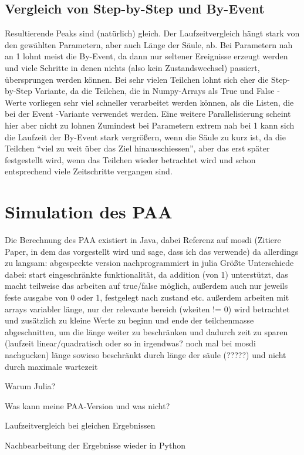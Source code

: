 \subsection{Vergleich von Step-by-Step und By-Event}
Resultierende Peaks sind (natürlich) gleich. Der Laufzeitvergleich hängt stark von den gewählten Parametern, aber auch Länge der Säule, ab.
Bei Parametern nah an 1 lohnt meist die By-Event, da dann nur seltener Ereignisse erzeugt werden und viele Schritte in denen nichts (also kein Zustandswechsel) passiert, übersprungen werden können.
Bei sehr vielen Teilchen lohnt sich eher die Step-by-Step Variante, da die Teilchen, die in Numpy-Arrays als True und False - Werte vorliegen sehr viel schneller verarbeitet werden können, als die Listen, die bei der Event -Variante verwendet werden. Eine weitere Parallelisierung scheint hier aber nicht zu lohnen
Zumindest bei Parametern extrem nah bei 1 kann sich die Laufzeit der By-Event stark vergrößern, wenn die Säule zu kurz ist, da die Teilchen ``viel zu weit über das Ziel hinausschiessen'', aber das erst später festgestellt wird, wenn das Teilchen wieder betrachtet wird und schon entsprechend viele Zeitschritte vergangen sind. 


\section{Simulation des PAA}
Die Berechnung des PAA existiert in Java, dabei Referenz auf mosdi (Zitiere Paper, in dem das vorgestellt wird und sage, dass ich das verwende)
da allerdings zu langsam: abgespeckte version nachprogrammiert in julia
Größte Unterschiede dabei: start eingeschränkte funktionalität, da addition (von 1) unterstützt, das macht teilweise das arbeiten auf true/false möglich, außerdem auch nur jeweils feste ausgabe von 0 oder 1, festgelegt nach zustand etc.
außerdem arbeiten mit arrays variabler länge, nur der relevante bereich (wkeiten != 0) wird betrachtet und zusätzlich zu kleine Werte zu beginn und ende der teilchenmasse abgeschnitten, um die länge weiter zu beschränken und dadurch zeit zu sparen (laufzeit linear/quadratisch oder so in irgendwas? noch mal bei mosdi nachgucken) länge sowieso beschränkt durch länge der säule (?????) und nicht durch maximale wartezeit

Warum Julia? 

Was kann meine PAA-Version und was nicht?

Laufzeitvergleich bei gleichen Ergebnissen

Nachbearbeitung der Ergebnisse wieder in Python



